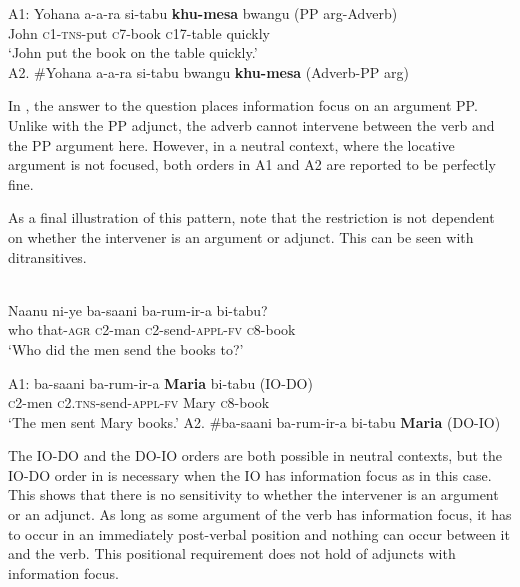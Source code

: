 \documentclass[output=paper]{langsci/langscibook}
\begin{document}
\ea\label{ex:}
\gll A1:  Yohana    a-a-ra  si-tabu    \textbf{{khu-mesa}}  bwangu     (PP arg-Adverb) \\
       John       \textsc{c1-tns-}put  \textsc{c}7-book   \textsc{c}17-table   quickly\\
\glt   ‘John put the book on the table quickly.’   \\ 
 A2.  \#Yohana   a-a-ra   si-tabu      bwangu   \textbf{khu-mesa}         (Adverb-PP arg)\\
\z
 


In , the answer to the question places information focus on an argument PP. Unlike with the PP adjunct, the adverb cannot intervene between the verb and the PP argument here. However, in a neutral context, where the locative argument is not focused, both orders in A1 and A2 are reported to be perfectly fine.

  As a final illustration of this pattern, note that the restriction is not dependent on whether the intervener is an argument or adjunct. This can be seen with ditransitives. 


\ea\label{ex:}
\\
\gll   Naanu    ni-ye    ba-saani   ba-rum-ir-a     bi-tabu?\\
     who     that-\textsc{agr}   \textsc{c}2-man   \textsc{c}2-send-\textsc{appl-fv}   \textsc{c}8-book\\
\glt ‘Who did the men send the books to?’
\z




\ea\label{ex:}
\gll A1:  ba-saani   ba-rum-ir-a    \textbf{{Maria}}     bi-tabu       (IO-DO) \\
       \textsc{c}2-men   \textsc{c2.tns}-send-\textsc{appl-fv}   Mary      \textsc{c}8-book  \\
\glt    ‘The men sent Mary books.’
 A2.  \#ba-saani  ba-rum-ir-a      bi-tabu   \textbf{Maria}  (DO-IO) \\
\z

The IO-DO and the DO-IO orders are both possible in neutral contexts, but the IO-DO order in  is necessary when the IO has information focus as in this case. This shows that there is no sensitivity to whether the intervener is an argument or an adjunct. As long as some argument of the verb has information focus, it has to occur in an immediately post-verbal position and nothing can occur between it and the verb. This positional requirement does not hold of adjuncts with information focus.
\end{document}
